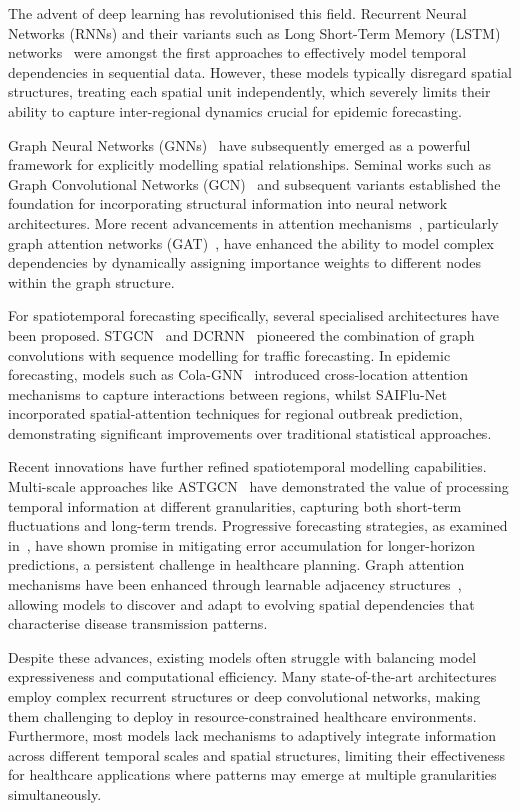 \documentclass[lettersize, journal]{IEEEtran}
\begin{document}
The advent of deep learning has revolutionised this field. Recurrent Neural Networks (RNNs) and their variants such as Long Short-Term Memory (LSTM) networks~\cite{lstm} were amongst the first approaches to effectively model temporal dependencies in sequential data. However, these models typically disregard spatial structures, treating each spatial unit independently, which severely limits their ability to capture inter-regional dynamics crucial for epidemic forecasting.

Graph Neural Networks (GNNs)~\cite{gnn_survey} have subsequently emerged as a powerful framework for explicitly modelling spatial relationships. Seminal works such as Graph Convolutional Networks (GCN)~\cite{gcn} and subsequent variants established the foundation for incorporating structural information into neural network architectures. More recent advancements in attention mechanisms~\cite{attention_mechanisms}, particularly graph attention networks (GAT)~\cite{gat}, have enhanced the ability to model complex dependencies by dynamically assigning importance weights to different nodes within the graph structure.

For spatiotemporal forecasting specifically, several specialised architectures have been proposed. STGCN~\cite{stgcn} and DCRNN~\cite{dcrnn} pioneered the combination of graph convolutions with sequence modelling for traffic forecasting. In epidemic forecasting, models such as Cola-GNN~\cite{cola_gnn} introduced cross-location attention mechanisms to capture interactions between regions, whilst SAIFlu-Net~\cite{saiflu_net} incorporated spatial-attention techniques for regional outbreak prediction, demonstrating significant improvements over traditional statistical approaches.

Recent innovations have further refined spatiotemporal modelling capabilities. Multi-scale approaches like ASTGCN~\cite{astgcn} have demonstrated the value of processing temporal information at different granularities, capturing both short-term fluctuations and long-term trends. Progressive forecasting strategies, as examined in~\cite{progressive_forecasting}, have shown promise in mitigating error accumulation for longer-horizon predictions, a persistent challenge in healthcare planning. Graph attention mechanisms have been enhanced through learnable adjacency structures~\cite{adaptive_graph}, allowing models to discover and adapt to evolving spatial dependencies that characterise disease transmission patterns.

Despite these advances, existing models often struggle with balancing model expressiveness and computational efficiency. Many state-of-the-art architectures employ complex recurrent structures or deep convolutional networks, making them challenging to deploy in resource-constrained healthcare environments. Furthermore, most models lack mechanisms to adaptively integrate information across different temporal scales and spatial structures, limiting their effectiveness for healthcare applications where patterns may emerge at multiple granularities simultaneously.
\end{document}
